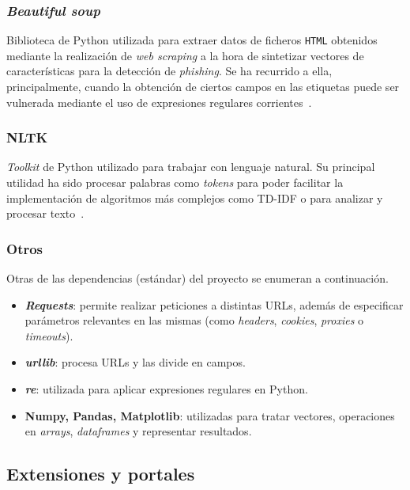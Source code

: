 \subsubsection{\textit{Beautiful soup}}

Biblioteca de Python utilizada para extraer datos de ficheros \texttt{HTML} obtenidos mediante la realización de \textit{web scraping} a la hora de sintetizar vectores de características para la detección de \textit{phishing}. Se ha recurrido a ella, principalmente, cuando la obtención de ciertos campos en las etiquetas puede ser vulnerada mediante el uso de expresiones regulares corrientes~\cite{bs4Docs}.


\subsubsection{NLTK}

\textit{Toolkit} de Python utilizado para trabajar con lenguaje natural. Su principal utilidad ha sido procesar palabras como \textit{tokens} para poder facilitar la implementación de algoritmos más complejos como TD-IDF o para analizar y procesar texto~\cite{nltk}.

\subsubsection{Otros}

Otras de las dependencias (estándar) del proyecto se enumeran a continuación.

\begin{itemize}
	\item \textbf{\textit{Requests}}: permite realizar peticiones a distintas URLs, además de especificar parámetros relevantes en las mismas (como \textit{headers}, \textit{cookies}, \textit{proxies} o \textit{timeouts}).
	\item \textbf{\textit{urllib}}: procesa URLs y las divide en campos.
	\item \textbf{\textit{re}}: utilizada para aplicar expresiones regulares en Python.
	\item \textbf{Numpy, Pandas, Matplotlib}: utilizadas para tratar vectores, operaciones en \textit{arrays}, \textit{dataframes} y representar resultados.
\end{itemize}


\subsection{Extensiones y portales}

